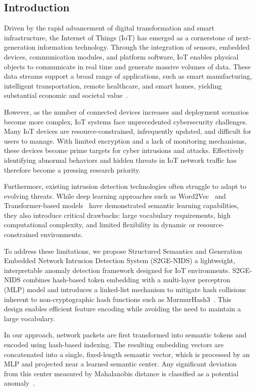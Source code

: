\begin{ZhChapter}
    \chapter{Introduction}
    Driven by the rapid advancement of digital transformation and smart infrastructure, the Internet of Things (IoT) has emerged as a cornerstone of next-generation information technology. Through the integration of sensors, embedded devices, communication modules, and platform software, IoT enables physical objects to communicate in real time and generate massive volumes of data. These data streams support a broad range of applications, such as smart manufacturing, intelligent transportation, remote healthcare, and smart homes, yielding substantial economic and societal value~\cite{atzori2010internet}.

    However, as the number of connected devices increases and deployment scenarios become more complex, IoT systems face unprecedented cybersecurity challenges. Many IoT devices are resource-constrained, infrequently updated, and difficult for users to manage. With limited encryption and a lack of monitoring mechanisms, these devices become prime targets for cyber intrusions and attacks. Effectively identifying abnormal behaviors and hidden threats in IoT network traffic has therefore become a pressing research priority.

    Furthermore, existing intrusion detection technologies often struggle to adapt to evolving threats. While deep learning approaches such as Word2Vec~\cite{sugathadasa2017synergistic} and Transformer-based models~\cite{han2022survey} have demonstrated semantic learning capabilities, they also introduce critical drawbacks: large vocabulary requirements, high computational complexity, and limited flexibility in dynamic or resource-constrained environments.

    To address these limitations, we propose Structured Semantics and Generation Embedded Network Intrusion Detection System (S2GE-NIDS) a lightweight, interpretable anomaly detection framework designed for IoT environments. S2GE-NIDS combines hash-based token embedding with a multi-layer perceptron (MLP) model and introduces a linked-list mechanism to mitigate hash collisions inherent to non-cryptographic hash functions such as MurmurHash3~\cite{yamaguchi2013hardware}. This design enables efficient feature encoding while avoiding the need to maintain a large vocabulary.

    In our approach, network packets are first transformed into semantic tokens and encoded using hash-based indexing. The resulting embedding vectors are concatenated into a single, fixed-length semantic vector, which is processed by an MLP and projected near a learned semantic center. Any significant deviation from this center measured by Mahalanobis distance is classified as a potential anomaly~\cite{liu2020anomaly}.


\end{ZhChapter}

